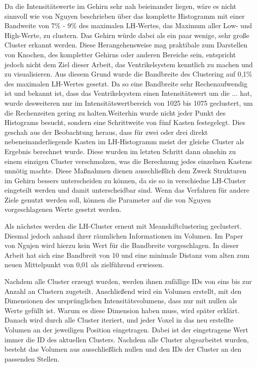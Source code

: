 Da die Intensitätswerte im Gehirn sehr nah beieinander liegen, wäre es nicht sinnvoll wie von Nguyen beschrieben über das komplette Histogramm mit einer Bandweite von 7\% - 9\% des maximalen LH-Wertes, das Maximum aller Low- und High-Werte, zu clustern. Das Gehirn würde dabei als ein paar wenige, sehr große Cluster erkannt werden. Diese Herangehensweise mag praktibale zum Darstellen von Knochen, des kompletter Gehirns oder anderen Bereiche sein, entspricht jedoch nicht dem Ziel dieser Arbeit, das Ventrikelsystem kenntlich zu machen und zu visualisieren. Aus diesem Grund wurde die Bandbreite des Clustering auf 0,1\% des maximalen LH-Wertes gesetzt. Da so eine Bandbreite sehr Rechenaufwendig ist und bekannt ist, dass das Ventrikelsystem einen Intensitätswert um die ... hat, wurde desweiteren nur im Intensitätswertbereich von 1025 bis 1075 geclustert, um die Rechenzeiten gering zu halten.Weiterhin wurde nicht jeder Punkt des Histograms besucht, sondern eine Schrittweite von fünf Kasten festegelegt. Dies geschah aus der Beobachtung heraus, dass für zwei oder drei direkt nebeneinanderliegende Kasten im LH-Histogramm meist der gleiche Cluster als Ergebnis berechnet wurde. Diese wurden im letzten Schritt dann ohnehin zu einem einzigen Cluster verschmolzen, was die Berechnung jedes einzelnen Kastens unnötig machte. Diese Maßnahmen dienen ausschließlich dem Zweck Strukturen im Gehirn bessers unterscheiden zu können, da sie so in verschiedne LH-Cluster eingeteilt werden und damit unterscheidbar sind. Wenn das Verfahren für andere Ziele genutzt werden soll, können die Parameter auf die von Nguyen vorgeschlagenen Werte gesetzt werden. 




Als nächstes werden die LH-Cluster erneut mit Meanshiftclustering geclustert. Diesmal jedoch anhand ihrer räumlichen Informationen im Volumen. Im Paper von Ngujen wird hierzu kein Wert für die Bandbreite vorgeschlagen. In dieser Arbeit hat sich eine Bandbreit von 10  und eine minimale Distanz vom alten zum neuen Mittelpunkt von 0,01 als zielführend erwiesen.



Nachdem alle Cluster erzeugt wurden, werden ihnen zufällige IDs von eins bis zur Anzahl an Clustern zugeteilt. Anschließend wird ein Volumen erstellt, mit den Dimensionen des ursprünglichen Intensitätsvolumens, dass nur mit nullen als Werte gefüllt ist. Warum es diese Dimension haben muss, wird später erklärt. Danach wird durch alle Cluster iteriert, und jeder Voxel in das neu erstellte Volumen an der jeweiligen Position eingetragen. Dabei ist der eingetragene Wert immer die  ID des aktuellen Clusters. Nachdem alle Cluster abgearbeitet wurden, besteht das Volumen aus ausschließlich nullen und den IDs der Cluster an den passenden Stellen.


